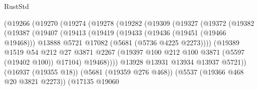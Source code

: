 \begin{lexlean}{RustStd}
\begin{coremodule}
                              (@19266
                                (@19270
                                  (@19274
                                    (@19278
                                      (@19282
                                        (@19309
                                          (@19327
                                            (@19372
                                              (@19382
                                                (@19387
                                                  (@19407
                                                    (@19413
                                                      (@19419
                                                        (@19433
                                                          (@19436 (@19451 (@19466 @19468)))
                                                          @13888
                                                          @5721
                                                          @17082
                                                          (@5681 (@5736 @4225 @2273))))
                                                      (@19389
                                                        @1519
                                                        @54
                                                        @212
                                                        @27
                                                        @3871
                                                        @2267
                                                        (@19397
                                                          @100
                                                          @212
                                                          @100
                                                          @3871
                                                          (@5597 (@19402 @100))
                                                          @17104)
                                                        @19468))))
                                                @13928
                                                @13931
                                                @13934
                                                @13937
                                                @5721))
                                            (@16937 (@19355 @18))
                                            (@5681 (@19359 @276 @468))
                                            (@5537 (@19366 @468 @20 @3821 @2273))
                                            (@17135
                                              @19060

\end{coremodule}
\end{lexlean}
